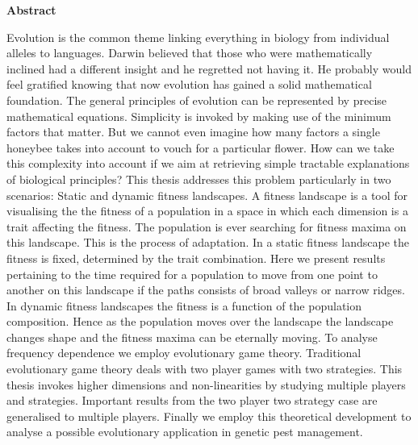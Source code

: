 \documentclass[oneside,11pt,a4paper]{book}
\begin{document}
\newpage
\thispagestyle{plain}
\renewcommand{\thepage}{\roman{page}}
\begin{center}
\Large{\textbf{Abstract}}\\
\end{center}
Evolution is the common theme linking everything in biology from individual alleles to languages.
Darwin believed that those who were mathematically inclined had a different insight and he regretted not having it.
He probably would feel gratified knowing that now evolution has gained a solid mathematical foundation.
The general principles of evolution can be represented by precise mathematical equations.
Simplicity is invoked by making use of the minimum factors that matter.
But we cannot even imagine how many factors a single honeybee takes into account to vouch for a particular flower.
How can we take this complexity into account if we aim at retrieving simple tractable explanations of biological principles?
This thesis addresses this problem particularly in two scenarios:
Static and dynamic fitness landscapes.
A fitness landscape is a tool for visualising the the fitness of a population in a space in which each dimension is a trait affecting the fitness.
The population is ever searching for fitness maxima on this landscape.
This is the process of adaptation.
In a static fitness landscape the fitness is fixed, determined by the trait combination.
Here we present results pertaining to the time required for a population to move from one point to another on this landscape if the paths consists of broad valleys or narrow ridges.
In dynamic fitness landscapes the fitness is a function of the population composition.
Hence as the population moves over the landscape the landscape changes shape and the fitness maxima can be eternally moving.
To analyse frequency dependence we employ evolutionary game theory.
Traditional evolutionary game theory deals with two player games with two strategies.
This thesis invokes higher dimensions and non-linearities by studying multiple players and strategies.
Important results from the two player two strategy case are generalised to multiple players.
Finally we employ this theoretical development to analyse a possible evolutionary application in genetic pest management.

\newpage
\thispagestyle{empty}
\mbox{}

\mainmatter
\end{document}
